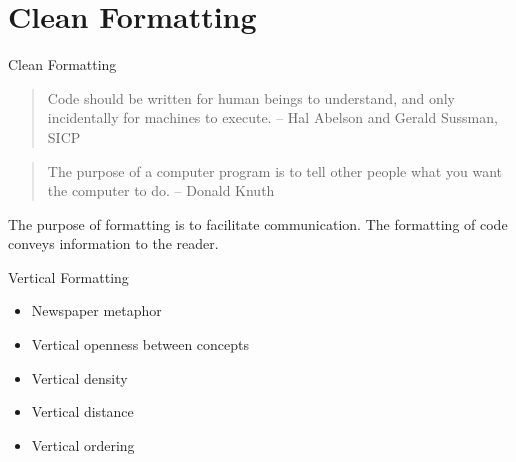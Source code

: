 \documentclass{beamer}
\begin{document}
\section{Clean Formatting}

\begin{frame}[fragile]{Clean Formatting}

\begin{quote}
Code should be written for human beings to understand, and only incidentally for machines to execute. -- Hal Abelson and Gerald Sussman, SICP
\end{quote}

\begin{quote}
The purpose of a computer program is to tell other people what you want the computer to do. -- Donald Knuth
\end{quote}


The purpose of formatting is to facilitate communication.  The formatting of code conveys information to the reader.



\end{frame}

\begin{frame}[fragile]{Vertical Formatting}

\begin{itemize}
\item Newspaper metaphor
\item Vertical openness between concepts
\item Vertical density
\item Vertical distance
\item Vertical ordering
\end{itemize}


\end{frame}
\end{document}
